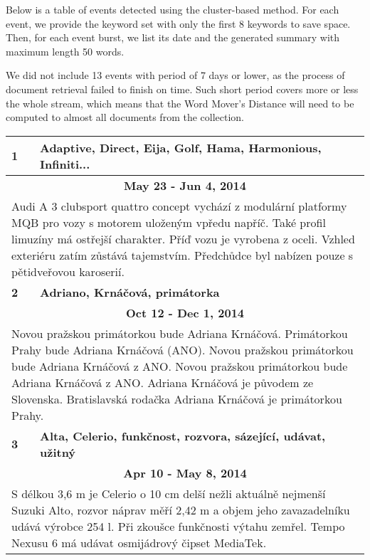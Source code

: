 Below is a table of events detected using the cluster-based method. For each event, we provide the keyword set with only the first 8 keywords to save space. Then, for each event burst, we list its date and the generated summary with maximum length 50 words.

We did not include 13 events with period of 7 days or lower, as the process of document retrieval failed to finish on time. Such short period covers more or less the whole stream, which means that the Word Mover's Distance will need to be computed to almost all documents from the collection.


\begin{tabularx}{\linewidth}{l l} \toprule[1.5pt]

\bf 1 & \bf Adaptive, Direct, Eija, Golf, Hama, Harmonious, Infiniti... \\ \midrule
\multicolumn{2}{c}{\bf May 23 - Jun 4, 2014} \\
\multicolumn{2}{p{\linewidth}}{Audi A 3 clubsport quattro concept vychází z modulární platformy MQB pro vozy s motorem uloženým vpředu napříč. Také profil limuzíny má ostřejší charakter. Příď vozu je vyrobena z oceli. Vzhled exteriéru zatím zůstává tajemstvím. Předchůdce byl nabízen pouze s pětidveřovou karoserií.} \\ \midrule[1.5pt]

\bf 2 & \bf Adriano, Krnáčová, primátorka \\ \midrule
\multicolumn{2}{c}{\bf Oct 12 - Dec 1, 2014} \\
\multicolumn{2}{p{\linewidth}}{Novou pražskou primátorkou bude Adriana Krnáčová. Primátorkou Prahy bude Adriana Krnáčová (ANO). Novou pražskou primátorkou bude Adriana Krnáčová z ANO. Novou pražskou primátorkou bude Adriana Krnáčová z ANO. Adriana Krnáčová je původem ze Slovenska. Bratislavská rodačka Adriana Krnáčová je primátorkou Prahy.} \\ \midrule[1.5pt]

\bf 3 & \bf Alta, Celerio, funkčnost, rozvora, sázející, udávat, užitný \\ \midrule
\multicolumn{2}{c}{\bf Apr 10 - May 8, 2014} \\
\multicolumn{2}{p{\linewidth}}{S délkou 3,6 m je Celerio o 10 cm delší nežli aktuálně nejmenší Suzuki Alto, rozvor náprav měří 2,42 m a objem jeho zavazadelníku udává výrobce 254 l. Při zkoušce funkčnosti výtahu zemřel. Tempo Nexusu 6 má udávat osmijádrový čipset MediaTek.} \\ \midrule[1.5pt]


\end{tabularx}
